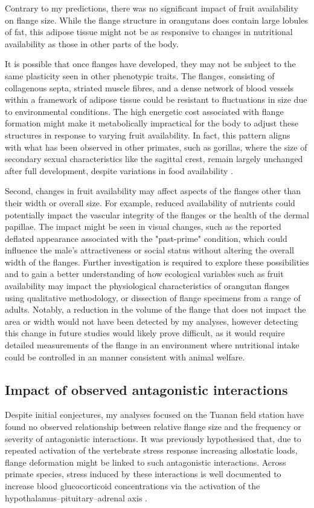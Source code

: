 Contrary to my predictions, there was no significant impact of fruit availability on flange size. While the flange structure in orangutans does contain large lobules of fat, this adipose tissue might not be as responsive to changes in nutritional availability as those in other parts of the body. 

It is possible that once flanges have developed, they may not be subject to the same plasticity seen in other phenotypic traits. The flanges, consisting of collagenous septa, striated muscle fibres, and a dense network of blood vessels within a framework of adipose tissue \citep{Straus.1942, Kinglsey.1988} could be resistant to fluctuations in size due to environmental conditions. The high energetic cost associated with flange formation might make it metabolically impractical for the body to adjust these structures in response to varying fruit availability. In fact, this pattern aligns with what has been observed in other primates, such as gorillas, where the size of secondary sexual characteristics like the sagittal crest, remain largely unchanged after full development, despite variations in food availability \citep{Caillaud.2008m5r}.

Second, changes in fruit availability may affect aspects of the flanges other than their width or overall size. For example, reduced availability of nutrients could potentially impact the vascular integrity of the flanges or the health of the dermal papillae. The impact might be seen in visual changes, such as the reported deflated appearance associated with the "past-prime" condition, which could influence the male's attractiveness or social status without altering the overall width of the flanges. Further investigation is required to explore these possibilities and to gain a better understanding of how ecological variables such as fruit availability may impact the physiological characteristics of orangutan flanges using qualitative methodology, or dissection of flange specimens from a range of adults. Notably, a reduction in the volume of the flange that does not impact the area or width would not have been detected by my analyses, however detecting this change in future studies would likely prove difficult, as it would require detailed measurements of the flange in an environment where nutritional intake could be controlled in an manner consistent with animal welfare.

\subsection{Impact of observed antagonistic interactions}
Despite initial conjectures, my analyses focused on the Tuanan field station have found no observed relationship between relative flange size and the frequency or severity of antagonistic interactions. It was previously hypothesised that, due to repeated activation of the vertebrate stress response increasing allostatic loads, flange deformation might be linked to such antagonistic interactions. Across primate species, stress induced by these interactions is well documented to increase blood glucocorticoid concentrations via the activation of the hypothalamus–pituitary–adrenal axis \citep{Maestripieri.2011, Setchell.2016, Edes.2017}.

